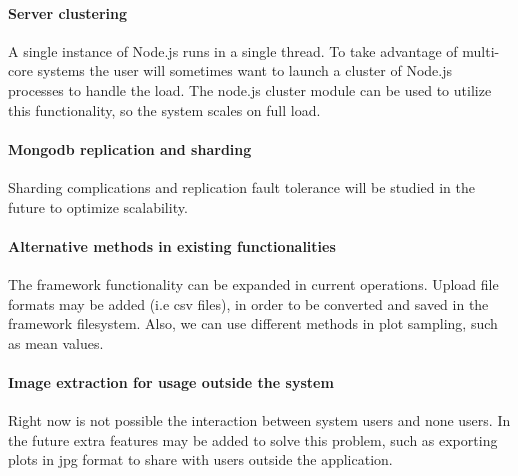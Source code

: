 \paragraph{Server clustering}  A single instance of Node.js runs in a single thread. To take advantage of multi-core systems the user will sometimes want to launch a cluster of Node.js processes to handle the load. The node.js cluster module can be used to utilize this functionality, so the system scales on full load.

\paragraph{Mongodb replication and sharding} Sharding complications and replication fault tolerance will be studied in the future to optimize scalability.

\paragraph{Alternative methods in existing functionalities}
The framework functionality can be expanded in current operations. Upload file formats may be added (i.e csv files), in order to be converted and saved in the framework filesystem. Also, we can use different methods in plot sampling, such as mean values.
 
\paragraph{Image extraction for usage outside the system}
Right now is not possible the interaction between system users and none users. In the future extra features may be added to solve this problem, such as exporting plots in jpg format to share with users outside the application.

	